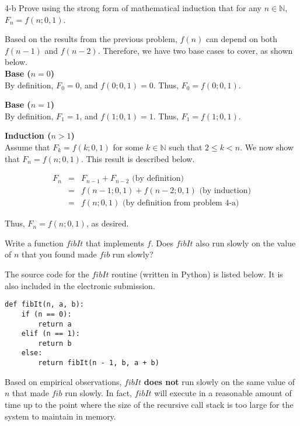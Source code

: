 \documentclass[11pt]{article}
\begin{document}
\begin{prob}{4-b}
Prove using the strong form of mathematical induction that for any $n \in \mathbb{N}$, $F_{n} = f(n;0,1)$.
\end{prob}
\begin{sol} 
Based on the results from the previous problem, $f(n)$ can depend on both $f(n-1)$ and $f(n-2)$. Therefore, we have two base cases to cover, as shown below. \\

\textbf{Base ($n = 0$)} \\
By definition, $F_{0} = 0$, and $f(0;0,1) = 0$. Thus, $F_{0} = f(0;0,1)$.

\textbf{Base ($n = 1$)} \\
By definition, $F_{1} = 1$, and $f(1;0,1) = 1$. Thus, $F_{1} = f(1;0,1)$.

\textbf{Induction ($n > 1$)} \\
Assume that $F_{k} = f(k;0,1)$ for some $k \in \mathbb{N}$ such that $2 \leq k < n$. We now show that $F_{n} = f(n;0,1)$. This result is described below.

\begin{eqnarray*}
F_{n} & = & F_{n - 1} + F_{n - 2} \text{ (by definition)} \\
& = & f(n - 1;0,1) + f(n-2;0,1) \text{ (by induction)} \\
& = & f(n;0,1) \text{ (by definition from problem 4-a)}
\end{eqnarray*}

Thus, $F_{n} = f(n;0,1)$, as desired.

\end{sol}

\begin{prob}{5}
Write a function $fibIt$ that implements $f$. Does $fibIt$ also run slowly on the value of $n$ that you found made $fib$ run slowly?
\end{prob}
\begin{sol} 
The source code for the $fibIt$ routine (written in Python) is listed below. It is also included in the electronic submission.

\begin{lstlisting}
def fibIt(n, a, b):
	if (n == 0):
		return a
	elif (n == 1):
		return b
	else:
		return fibIt(n - 1, b, a + b)
\end{lstlisting}
\end{sol}

Based on empirical observations, $fibIt$ \textbf{does not} run slowly on the same value of $n$ that made $fib$ run slowly. In fact, $fibIt$ will execute in a reasonable amount of time up to the point where the size of the recursive call stack is too large for the system to maintain in memory. 

\end{document}
